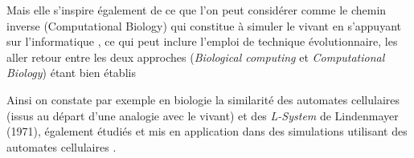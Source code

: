 
Mais elle s'inspire également de ce que l'on peut considérer comme le chemin inverse (Computational Biology) qui constitue à simuler le vivant en s'appuyant sur l'informatique \autocite{Ermentrout1993}, ce qui peut inclure l'emploi de technique évolutionnaire, les aller retour entre les deux approches (\textit{Biological computing} et \textit{Computational Biology}) étant bien établis \autocites{Giavitto2002, Hogeweg1992, Hogeweg2011}

Ainsi on constate par exemple en biologie la similarité \autocites{ Hogeweg1974, Stauffer1998} des automates cellulaires (issus au départ d'une analogie avec le vivant) et des \textit{L-System} \autocite{Prusinkiewicz1999} de Lindenmayer (1971), également étudiés et mis en application dans des simulations utilisant des automates cellulaires \autocites{Hogeweg1978}.


